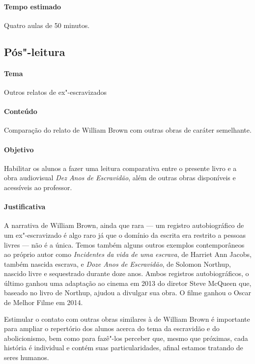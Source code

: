 \documentclass[12pt]{extarticle}
\begin{document}
 \paragraph{Tempo estimado} Quatro aulas de 50 minutos.



\subsection{Pós"-leitura}

 \paragraph{Tema} Outros relatos de ex"-escravizados

 \paragraph{Conteúdo} Comparação do relato de William Brown com outras
 obras de caráter semelhante.

 \paragraph{Objetivo} Habilitar os alunos a fazer uma leitura comparativa
 entre o presente livro e a obra audiovisual \emph{Dez Anos de Escravidão},
 além de outras obras disponíveis e acessíveis ao professor. 

 \paragraph{Justificativa} A narrativa de William Brown, ainda que 
 rara --- um registro autobiográfico de um ex"-escravizado é algo raro
 já que o domínio da escrita era restrito a pessoas livres --- não 
 é a única. Temos também alguns outros exemplos contemporâneos 
 ao próprio autor como \emph{Incidentes da vida de uma escrava}, de Harriet
 Ann Jacobs, também nascida escrava, e \emph{Doze Anos de Escravidão}, de 
 Solomon Northup, nascido livre e sequestrado durante doze anos. Ambos 
 registros autobiográficos, o último ganhou uma adaptação ao cinema em 
 2013 do diretor Steve McQueen que, baseado no livro de Northup, ajudou
 a divulgar sua obra. O filme ganhou o Oscar de Melhor Filme em 2014. 

 Estimular o contato com outras obras similares à de William Brown
 é importante para ampliar o repertório dos alunos acerca do tema
 da escravidão e do abolicionismo, bem como para fazê"-los perceber
 que, mesmo que próximas, cada história é individual e contém 
 suas particularidades, afinal estamos tratando de seres humanos. 
\end{document}
